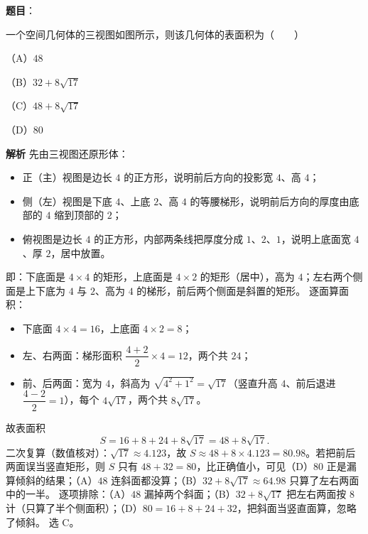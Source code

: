 \begin{answer}

\textbf{题目}：

一个空间几何体的三视图如图所示，则该几何体的表面积为\mbox{（　　）}

（A）$48$

（B）$32+8\sqrt{17}$

（C）$48+8\sqrt{17}$

（D）$80$
\nopagebreak[4]
\begin{center}\end{center}
\nopagebreak[4]
\textbf{解析}
先由三视图还原形体：
\begin{itemize}
\item 正（主）视图是边长 $4$ 的正方形，说明前后方向的投影宽 $4$、高 $4$；
\item 侧（左）视图是下底 $4$、上底 $2$、高 $4$ 的等腰梯形，说明前后方向的厚度由底部的 $4$ 缩到顶部的 $2$；
\item 俯视图是边长 $4$ 的正方形，内部两条线把厚度分成 $1$、$2$、$1$，说明上底面宽 $4$、厚 $2$，居中放置。
\end{itemize}
即：下底面是 $4\times4$ 的矩形，上底面是 $4\times2$ 的矩形（居中），高为 $4$；左右两个侧面是上下底为 $4$ 与 $2$、高为 $4$ 的梯形，前后两个侧面是斜置的矩形。
逐面算面积：
\begin{itemize}
\item 下底面 $4\times4=16$，上底面 $4\times2=8$；
\item 左、右两面：梯形面积 $\dfrac{4+2}{2}\times4=12$，两个共 $24$；
\item 前、后两面：宽为 $4$，斜高为 $\sqrt{4^2+1^2}=\sqrt{17}$（竖直升高 $4$、前后退进 $\dfrac{4-2}{2}=1$），每个 $4\sqrt{17}$，两个共 $8\sqrt{17}$。
\end{itemize}
故表面积
\nopagebreak[4]
\[
S=16+8+24+8\sqrt{17}=48+8\sqrt{17}.
\]
二次复算（数值核对）：$\sqrt{17}\approx4.123$，故 $S\approx48+8\times4.123=80.98$。若把前后两面误当竖直矩形，则 $S$ 只有 $48+32=80$，比正确值小，可见（D）$80$ 正是漏算倾斜的结果；（A）$48$ 连斜面都没算；（B）$32+8\sqrt{17}\approx64.98$ 只算了左右两面中的一半。
逐项排除：（A）$48$ 漏掉两个斜面；（B）$32+8\sqrt{17}$ 把左右两面按 $8$ 计（只算了半个侧面积）；（D）$80=16+8+24+32$，把斜面当竖直面算，忽略了倾斜。
选 C。


\end{answer}
